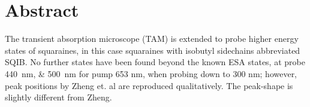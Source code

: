 \documentclass[twoside,openright,listof=numbered]{scrreprt}
\begin{document}
\nobibliography*







\printthesistitle


\chapter*{Abstract}
The transient absorption microscope (TAM) is extended to probe higher energy states of squaraines, in this case squaraines with isobutyl sidechains abbreviated SQIB. No further states have been found beyond the known ESA states, at probe \SIlist{440;500}{\nano\meter} for  pump 653 nm, when probing down to 300 nm; however, peak positions by Zheng et. al\cite{Zheng2020} are reproduced qualitatively. The peak-shape is slightly different from Zheng. 
\end{document}
